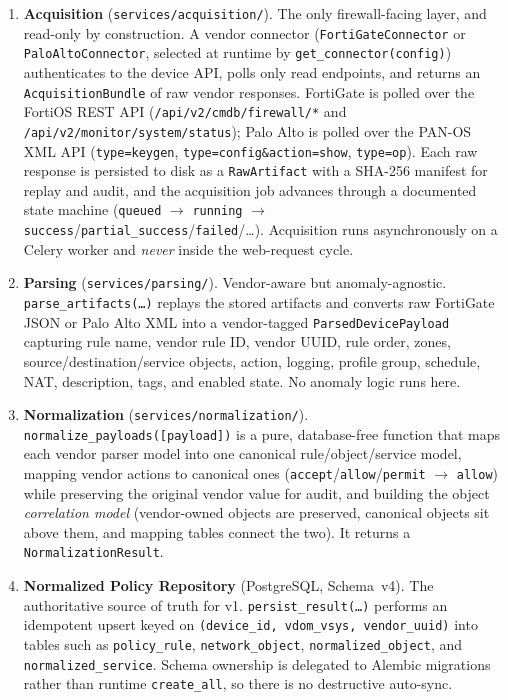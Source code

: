 \begin{enumerate}[leftmargin=2.2em]
  \item \textbf{Acquisition} (\texttt{services/acquisition/}). The only firewall-facing layer, and read-only by construction. A vendor connector (\texttt{FortiGateConnector} or \texttt{PaloAltoConnector}, selected at runtime by \texttt{get\_connector(config)}) authenticates to the device API, polls only read endpoints, and returns an \texttt{AcquisitionBundle} of raw vendor responses. FortiGate is polled over the FortiOS REST API (\texttt{/api/v2/cmdb/firewall/*} and \texttt{/api/v2/monitor/system/status}); Palo Alto is polled over the PAN-OS XML API (\texttt{type=keygen}, \texttt{type=config\&action=show}, \texttt{type=op}). Each raw response is persisted to disk as a \texttt{RawArtifact} with a SHA-256 manifest for replay and audit, and the acquisition job advances through a documented state machine (\texttt{queued} $\rightarrow$ \texttt{running} $\rightarrow$ \texttt{success}/\texttt{partial\_success}/\texttt{failed}/\dots). Acquisition runs asynchronously on a Celery worker and \emph{never} inside the web-request cycle.
  \item \textbf{Parsing} (\texttt{services/parsing/}). Vendor-aware but anomaly-agnostic. \texttt{parse\_artifacts(\dots)} replays the stored artifacts and converts raw FortiGate JSON or Palo Alto XML into a vendor-tagged \texttt{ParsedDevicePayload} capturing rule name, vendor rule ID, vendor UUID, rule order, zones, source/destination/service objects, action, logging, profile group, schedule, NAT, description, tags, and enabled state. No anomaly logic runs here.
  \item \textbf{Normalization} (\texttt{services/normalization/}). \texttt{normalize\_payloads([payload])} is a pure, database-free function that maps each vendor parser model into one canonical rule/object/service model, mapping vendor actions to canonical ones (\texttt{accept}/\texttt{allow}/\texttt{permit} $\rightarrow$ \texttt{allow}) while preserving the original vendor value for audit, and building the object \emph{correlation model} (vendor-owned objects are preserved, canonical objects sit above them, and mapping tables connect the two). It returns a \texttt{NormalizationResult}.
  \item \textbf{Normalized Policy Repository} (PostgreSQL, Schema~v4). The authoritative source of truth for v1. \texttt{persist\_result(\dots)} performs an idempotent upsert keyed on \texttt{(device\_id, vdom\_vsys, vendor\_uuid)} into tables such as \texttt{policy\_rule}, \texttt{network\_object}, \texttt{normalized\_object}, and \texttt{normalized\_service}. Schema ownership is delegated to Alembic migrations rather than runtime \texttt{create\_all}, so there is no destructive auto-sync.

\end{enumerate}
